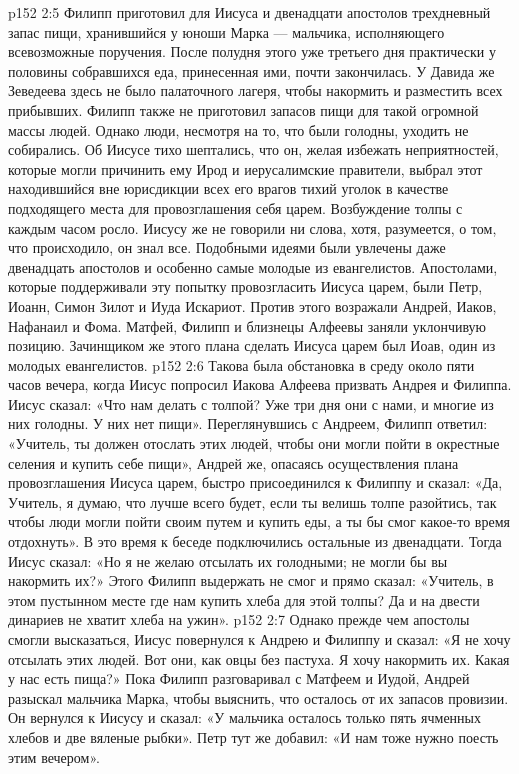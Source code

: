 \vs p152 2:5 \pc Филипп приготовил для Иисуса и двенадцати апостолов трехдневный запас пищи, хранившийся у юноши Марка --- мальчика, исполняющего всевозможные поручения. После полудня этого уже третьего дня практически у половины собравшихся еда, принесенная ими, почти закончилась. У Давида же Зеведеева здесь не было палаточного лагеря, чтобы накормить и разместить всех прибывших. Филипп также не приготовил запасов пищи для такой огромной массы людей. Однако люди, несмотря на то, что были голодны, уходить не собирались. Об Иисусе тихо шептались, что он, желая избежать неприятностей, которые могли причинить ему Ирод и иерусалимские правители, выбрал этот находившийся вне юрисдикции всех его врагов тихий уголок в качестве подходящего места для провозглашения себя царем. Возбуждение толпы с каждым часом росло. Иисусу же не говорили ни слова, хотя, разумеется, о том, что происходило, он знал все. Подобными идеями были увлечены даже двенадцать апостолов и особенно самые молодые из евангелистов. Апостолами, которые поддерживали эту попытку провозгласить Иисуса царем, были Петр, Иоанн, Симон Зилот и Иуда Искариот. Против этого возражали Андрей, Иаков, Нафанаил и Фома. Матфей, Филипп и близнецы Алфеевы заняли уклончивую позицию. Зачинщиком же этого плана сделать Иисуса царем был Иоав, один из молодых евангелистов.
\vs p152 2:6 \pc Такова была обстановка в среду около пяти часов вечера, когда Иисус попросил Иакова Алфеева призвать Андрея и Филиппа. Иисус сказал: «Что нам делать с толпой? Уже три дня они с нами, и многие из них голодны. У них нет пищи». Переглянувшись с Андреем, Филипп ответил: «Учитель, ты должен отослать этих людей, чтобы они могли пойти в окрестные селения и купить себе пищи», Андрей же, опасаясь осуществления плана провозглашения Иисуса царем, быстро присоединился к Филиппу и сказал: «Да, Учитель, я думаю, что лучше всего будет, если ты велишь толпе разойтись, так чтобы люди могли пойти своим путем и купить еды, а ты бы смог какое\hyp{}то время отдохнуть». В это время к беседе подключились остальные из двенадцати. Тогда Иисус сказал: «Но я не желаю отсылать их голодными; не могли бы вы накормить их?» Этого Филипп выдержать не смог и прямо сказал: «Учитель, в этом пустынном месте где нам купить хлеба для этой толпы? Да и на двести динариев не хватит хлеба на ужин».
\vs p152 2:7 Однако прежде чем апостолы смогли высказаться, Иисус повернулся к Андрею и Филиппу и сказал: «Я не хочу отсылать этих людей. Вот они, как овцы без пастуха. Я хочу накормить их. Какая у нас есть пища?» Пока Филипп разговаривал с Матфеем и Иудой, Андрей разыскал мальчика Марка, чтобы выяснить, что осталось от их запасов провизии. Он вернулся к Иисусу и сказал: «У мальчика осталось только пять ячменных хлебов и две вяленые рыбки». Петр тут же добавил: «И нам тоже нужно поесть этим вечером».
